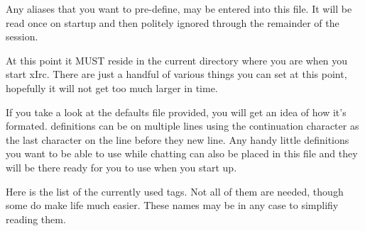 \documentclass[titlepage]{article}
\begin{document}
Any aliases that you want to pre-define, may be entered into this
file. It will be read once on startup and then politely ignored
through the remainder of the session.

At this point  it  MUST reside in the current directory where you are
when you start xIrc. There are just a handful of various things you
can set at this point, hopefully it will not get too much larger in
time.

If you take a look at the defaults file provided, you will get an idea
of  how  it's formated. definitions can be on multiple lines using the
continuation  character  as the last character on the line before they
new  line.  Any  handy  little  definitions you want to be able to use
while  chatting can also be placed in this file and they will be there
ready for you to use when you start up.

Here  is  the  list  of  the  currently used tags. Not all of them are
needed,  though  some  do make life much easier. These names may be in
any case to simplifiy reading them.
\end{document}
